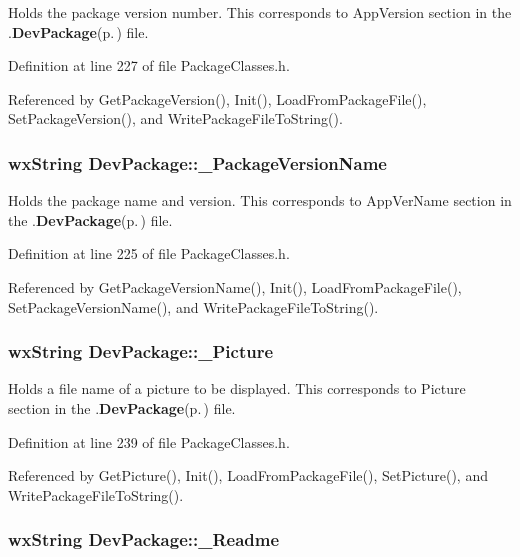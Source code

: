 Holds the package version number. This corresponds to App\-Version section in the .{\bf Dev\-Package}{\rm (p.\,\pageref{class_dev_package})} file. 

Definition at line 227 of file Package\-Classes.h.

Referenced by Get\-Package\-Version(), Init(), Load\-From\-Package\-File(), Set\-Package\-Version(), and Write\-Package\-File\-To\-String().
\subsubsection{\setlength{\rightskip}{0pt plus 5cm}wx\-String {\bf Dev\-Package::\_\-Package\-Version\-Name}\hspace{0.3cm}{\tt  [private]}}\label{class_dev_package_7265fc229dee35ae7fbec0613ee8fa61}


Holds the package name and version. This corresponds to App\-Ver\-Name section in the .{\bf Dev\-Package}{\rm (p.\,\pageref{class_dev_package})} file. 

Definition at line 225 of file Package\-Classes.h.

Referenced by Get\-Package\-Version\-Name(), Init(), Load\-From\-Package\-File(), Set\-Package\-Version\-Name(), and Write\-Package\-File\-To\-String().
\subsubsection{\setlength{\rightskip}{0pt plus 5cm}wx\-String {\bf Dev\-Package::\_\-Picture}\hspace{0.3cm}{\tt  [private]}}\label{class_dev_package_e8d0b5bbe6b5273708e0e5b7117f8a5f}


Holds a file name of a picture to be displayed. This corresponds to Picture section in the .{\bf Dev\-Package}{\rm (p.\,\pageref{class_dev_package})} file. 

Definition at line 239 of file Package\-Classes.h.

Referenced by Get\-Picture(), Init(), Load\-From\-Package\-File(), Set\-Picture(), and Write\-Package\-File\-To\-String().
\subsubsection{\setlength{\rightskip}{0pt plus 5cm}wx\-String {\bf Dev\-Package::\_\-Readme}\hspace{0.3cm}{\tt  [private]}}\label{class_dev_package_e14144292857e6dc2420da2e0b297e67}


